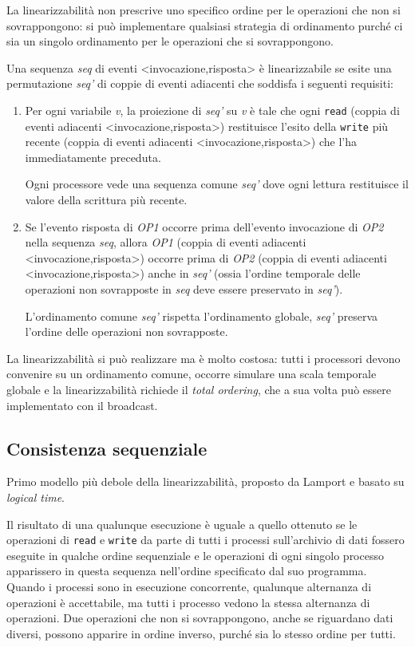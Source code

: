 La linearizzabilità non prescrive uno specifico ordine per le operazioni che non si sovrappongono: si può implementare qualsiasi strategia di ordinamento purché ci sia un singolo ordinamento per le operazioni che si sovrappongono.

\vspace{5mm}

Una sequenza \textit{seq} di eventi <invocazione,risposta> è linearizzabile se esite una permutazione \textit{seq'} di coppie di eventi adiacenti che soddisfa i seguenti requisiti:
\begin{enumerate}
    \item Per ogni variabile \textit{v}, la proiezione di \textit{seq'} su \textit{v} è tale che ogni \texttt{read} (coppia di eventi adiacenti <invocazione,risposta>) restituisce l'esito della \texttt{write} più recente (coppia di eventi adiacenti <invocazione,risposta>) che l'ha immediatamente preceduta.
    
    Ogni processore vede una sequenza comune \textit{seq'} dove ogni lettura restituisce il valore della scrittura più recente.
    \item Se l'evento risposta di \textit{OP1} occorre prima dell'evento invocazione di \textit{OP2} nella sequenza \textit{seq}, allora \textit{OP1} (coppia di eventi adiacenti <invocazione,risposta>) occorre prima di \textit{OP2} (coppia di eventi adiacenti <invocazione,risposta>) anche in \textit{seq'} (ossia l'ordine temporale delle operazioni non sovrapposte in \textit{seq} deve essere preservato in \textit{seq'}).
    
    L'ordinamento comune \textit{seq'} rispetta l'ordinamento globale, \textit{seq'} preserva l'ordine delle operazioni non sovrapposte.
\end{enumerate}

La linearizzabilità si può realizzare ma è molto costosa: tutti i processori devono convenire su un ordinamento comune, occorre simulare una scala temporale globale e la linearizzabilità richiede il \textit{total ordering}, che a sua volta può essere implementato con il broadcast.

\subsection{Consistenza sequenziale}
Primo modello più debole della linearizzabilità, proposto da Lamport e basato su \textit{logical time}.

Il risultato di una qualunque esecuzione è uguale a quello ottenuto se le operazioni di \texttt{read} e \texttt{write} da parte di tutti i processi sull'archivio di dati fossero eseguite in qualche ordine sequenziale e le operazioni di ogni singolo processo apparissero in questa sequenza nell'ordine specificato dal suo programma. Quando i processi sono in esecuzione concorrente, qualunque alternanza di operazioni è accettabile, ma tutti i processo vedono la stessa alternanza di operazioni. Due operazioni che non si sovrappongono, anche se riguardano dati diversi, possono apparire in ordine inverso, purché sia lo stesso ordine per tutti.


